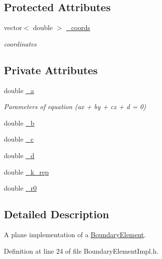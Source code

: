 \subsection*{Protected Attributes}
\begin{DoxyCompactItemize}
\item 
vector$<$ double $>$ \hyperlink{classBoundaryElement_ab51302e10e3e2def98438234ba5bf801}{\+\_\+coords}
\begin{DoxyCompactList}\small\item\em coordinates \end{DoxyCompactList}\end{DoxyCompactItemize}
\subsection*{Private Attributes}
\begin{DoxyCompactItemize}
\item 
double \hyperlink{classPlaneBoundaryElement_ad067a43fa80af86a71fa244024a3a92b}{\+\_\+a}
\begin{DoxyCompactList}\small\item\em Parameters of equation (ax + by + cz + d = 0) \end{DoxyCompactList}\item 
double \hyperlink{classPlaneBoundaryElement_a1725bf5a9d6a0d6df973bbf834f64afd}{\+\_\+b}
\item 
double \hyperlink{classPlaneBoundaryElement_ac76ace6d0b2da7e27cba5afd85ae8935}{\+\_\+c}
\item 
double \hyperlink{classPlaneBoundaryElement_a01c1e54fda120dba72c8cea1b3025ab7}{\+\_\+d}
\item 
double \hyperlink{classPlaneBoundaryElement_aaa66079ea34844957907160081ab3059}{\+\_\+k\+\_\+rep}
\item 
double \hyperlink{classPlaneBoundaryElement_a3638279689c7293ccce4d09946aa2dca}{\+\_\+r0}
\end{DoxyCompactItemize}


\subsection{Detailed Description}
A plane implementation of a \hyperlink{classBoundaryElement}{Boundary\+Element}. 

Definition at line 24 of file Boundary\+Element\+Impl.\+h.



